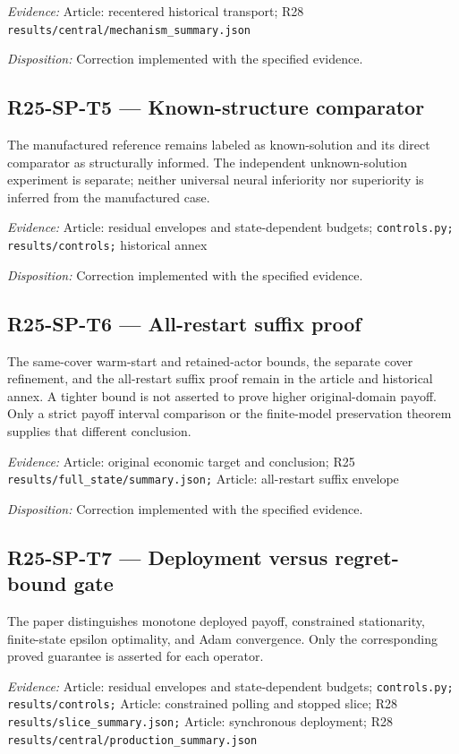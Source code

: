 \emph{Evidence:} Article: recentered historical transport; R28 \nolinkurl{results/central/mechanism_summary.json}

\emph{Disposition:} Correction implemented with the specified evidence.
\subsection{R25-SP-T5 --- Known-structure comparator}
The manufactured reference remains labeled as known-solution and its direct comparator as structurally informed. The independent unknown-solution experiment is separate; neither universal neural inferiority nor superiority is inferred from the manufactured case.

\emph{Evidence:} Article: residual envelopes and state-dependent budgets; \nolinkurl{controls.py;} \nolinkurl{results/controls;} historical annex

\emph{Disposition:} Correction implemented with the specified evidence.
\subsection{R25-SP-T6 --- All-restart suffix proof}
The same-cover warm-start and retained-actor bounds, the separate cover refinement, and the all-restart suffix proof remain in the article and historical annex. A tighter bound is not asserted to prove higher original-domain payoff. Only a strict payoff interval comparison or the finite-model preservation theorem supplies that different conclusion.

\emph{Evidence:} Article: original economic target and conclusion; R25 \nolinkurl{results/full_state/summary.json;} Article: all-restart suffix envelope

\emph{Disposition:} Correction implemented with the specified evidence.
\subsection{R25-SP-T7 --- Deployment versus regret-bound gate}
The paper distinguishes monotone deployed payoff, constrained stationarity, finite-state epsilon optimality, and Adam convergence. Only the corresponding proved guarantee is asserted for each operator.

\emph{Evidence:} Article: residual envelopes and state-dependent budgets; \nolinkurl{controls.py;} \nolinkurl{results/controls;} Article: constrained polling and stopped slice; R28 \nolinkurl{results/slice_summary.json;} Article: synchronous deployment; R28 \nolinkurl{results/central/production_summary.json}

